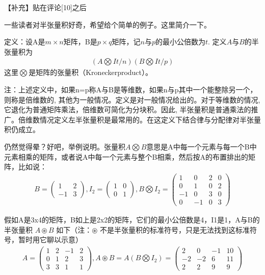 	【补充】贴在评论[10]之后
	
	一些读者对半张量积好奇，希望给个简单的例子。这里简介一下。
	
	定义：设A是$ m\times n $矩阵，B是$ p\times q $矩阵，记$ n $与$ p $的最小公倍数为$ t  $. 定义$ A $与$ B $的半张量积为
	\begin{gather*}
		  (A\bigotimes It/n)(B\bigotimes It/p) 
	\end{gather*}
	这里$ \bigotimes $是矩阵的张量积（Kroneckerproduct）。
	
	注：上述定义中，如果n=p称A与B是等维数，如果n与p其中一个能整除另一个，则称是倍维数的, 其他为一般情况。定义是对一般情况给出的。对于等维数的情况, 它退化为普通矩阵乘法，倍维数可简化为分块积。因此, 半张量积是普通乘法的推广。倍维数情况定义左半张量积是最常用的。在这定义下结合律与分配律对半张量积仍成立。
	
	仍然觉得晕？好吧，举例说明。张量积$ A\bigotimes B $意思是A中每一个元素与每一个B中元素相乘的矩阵，或者说A中每一个元素与整个B相乘，然后按A的布置排出的矩阵，比如说：
	\begin{gather*}
		B=\begin{pmatrix}1 &2 \\-1&3\end{pmatrix},I_2=\begin{pmatrix}1 &0\\0&1\end{pmatrix},B\bigotimes I_2=\begin{pmatrix}1 & 0 &  2& 0\\ 0 & 1 &  0& 2\\  -1&  0&  3& 0\\ 0 & -1 &  0& 3\end{pmatrix}
	\end{gather*}

	假如A是3x4的矩阵，B如上是2x2的矩阵，它们的最小公倍数是4，I1是1，A与B的半张量积 $ A\circledast B $ 如下（注：$ \circledast $ 不是半张量积的标准符号，只是无法找到这标准符号，暂时用它聊以示意）
	\begin{gather*}
		A=\begin{pmatrix}1 & 2 & -1& 2\\ 0 & 1 &  2& 3\\  3&  3&  1& 1\end{pmatrix}, A\circledast  B = A(B\bigotimes I_2)=\begin{pmatrix}2 & 0 & -1& 10\\ -2 & -2 & 6& 11\\2& 2& 9& 9\end{pmatrix}
	\end{gather*}
	
